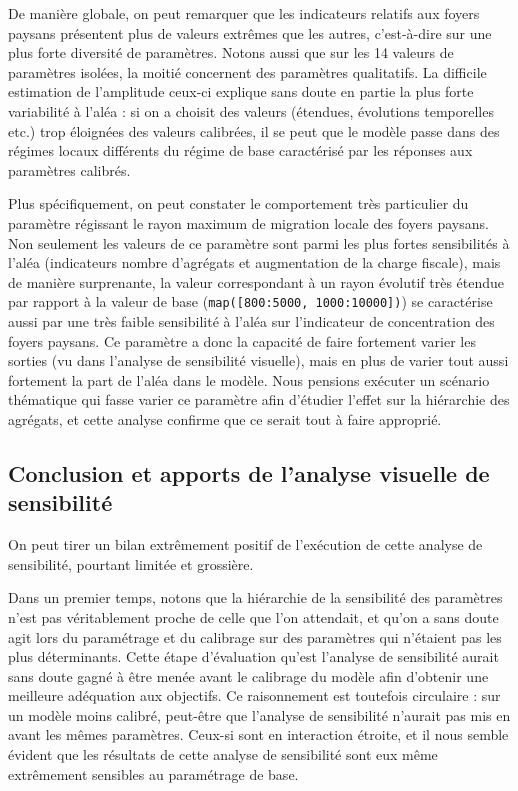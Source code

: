 De manière globale, on peut remarquer que les indicateurs relatifs aux foyers paysans présentent plus de valeurs extrêmes que les autres, c'est-à-dire sur une plus forte diversité de paramètres.
Notons aussi que sur les 14 valeurs de paramètres isolées, la moitié concernent des paramètres qualitatifs.
La difficile estimation de l'amplitude ceux-ci explique sans doute en partie la plus forte variabilité à l'aléa : si on a choisit des valeurs (étendues, évolutions temporelles etc.) trop éloignées des valeurs calibrées, il se peut que le modèle passe dans des régimes locaux différents du régime de base caractérisé par les réponses aux paramètres calibrés.

Plus spécifiquement, on peut constater le comportement très particulier du paramètre régissant le rayon maximum de migration locale des foyers paysans.
Non seulement les valeurs de ce paramètre sont parmi les plus fortes sensibilités à l'aléa (indicateurs nombre d'agrégats et augmentation de la charge fiscale), mais de manière surprenante, la valeur correspondant à un rayon évolutif très étendue par rapport à la valeur de base (\texttt{map([800:5000, 1000:10000])}) se caractérise aussi par une très faible sensibilité à l'aléa sur l'indicateur de concentration des foyers paysans.
Ce paramètre a donc la capacité de faire fortement varier les sorties (vu dans l'analyse de sensibilité visuelle), mais en plus de varier tout aussi fortement la part de l'aléa dans le modèle.
Nous pensions exécuter un scénario thématique qui fasse varier ce paramètre afin d'étudier l'effet sur la hiérarchie des agrégats, et cette analyse confirme que ce serait tout à faire approprié.

\subsection{Conclusion et apports de l'analyse visuelle de sensibilité}

On peut tirer un bilan extrêmement positif de l'exécution de cette analyse de sensibilité, pourtant limitée et grossière.

Dans un premier temps, notons que la hiérarchie de la sensibilité des paramètres n'est pas véritablement proche de celle que l'on attendait, et qu'on a sans doute agit lors du paramétrage et du calibrage sur des paramètres qui n'étaient pas les plus déterminants.
Cette étape d'évaluation qu'est l'analyse de sensibilité aurait sans doute gagné à être menée avant le calibrage du modèle afin d'obtenir une meilleure adéquation aux objectifs.
Ce raisonnement est toutefois circulaire : sur un modèle moins calibré, peut-être que l'analyse de sensibilité n'aurait pas mis en avant les mêmes paramètres.
Ceux-si sont en interaction étroite, et il nous semble évident que les résultats de cette analyse de sensibilité sont eux même extrêmement sensibles au paramétrage de base.

